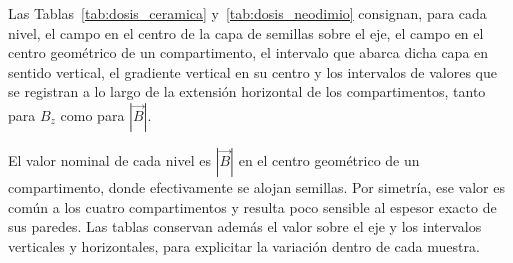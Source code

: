 Las Tablas~\ref{tab:dosis_ceramica} y~\ref{tab:dosis_neodimio} consignan, para cada nivel, el campo en el centro de la capa de semillas sobre el eje, el campo en el centro geométrico de un compartimento, el intervalo que abarca dicha capa en sentido vertical, el gradiente vertical en su centro y los intervalos de valores que se registran a lo largo de la extensión horizontal de los compartimentos, tanto para \(B_z\) como para \(|\vec{B}|\).

El valor nominal de cada nivel es \(|\vec{B}|\) en el centro geométrico de un compartimento, donde efectivamente se alojan semillas. Por simetría, ese valor es común a los cuatro compartimentos y resulta poco sensible al espesor exacto de sus paredes. Las tablas conservan además el valor sobre el eje y los intervalos verticales y horizontales, para explicitar la variación dentro de cada muestra.

